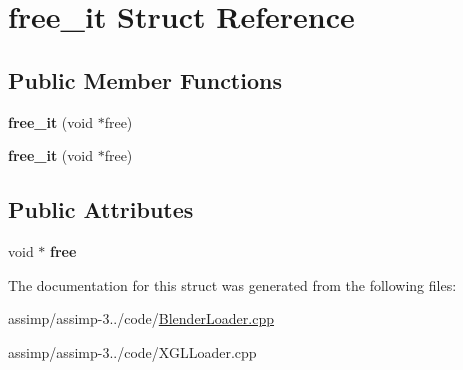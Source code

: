 \hypertarget{structfree__it}{\section{free\+\_\+it Struct Reference}
\label{structfree__it}
}
\subsection*{Public Member Functions}
\begin{DoxyCompactItemize}
\item 
\hypertarget{structfree__it_ae5a5338445d758777dc24e93956052d5}{{\bfseries free\+\_\+it} (void $\ast$free)}\label{structfree__it_ae5a5338445d758777dc24e93956052d5}

\item 
\hypertarget{structfree__it_ae5a5338445d758777dc24e93956052d5}{{\bfseries free\+\_\+it} (void $\ast$free)}\label{structfree__it_ae5a5338445d758777dc24e93956052d5}

\end{DoxyCompactItemize}
\subsection*{Public Attributes}
\begin{DoxyCompactItemize}
\item 
\hypertarget{structfree__it_ad5a1f2bee19a7292ea920c2dd7f648f0}{void $\ast$ {\bfseries free}}\label{structfree__it_ad5a1f2bee19a7292ea920c2dd7f648f0}

\end{DoxyCompactItemize}


The documentation for this struct was generated from the following files\+:\begin{DoxyCompactItemize}
\item 
assimp/assimp-\/3../code/\hyperlink{_blender_loader_8cpp}{Blender\+Loader.\+cpp}\item 
assimp/assimp-\/3../code/X\+G\+L\+Loader.\+cpp\end{DoxyCompactItemize}
